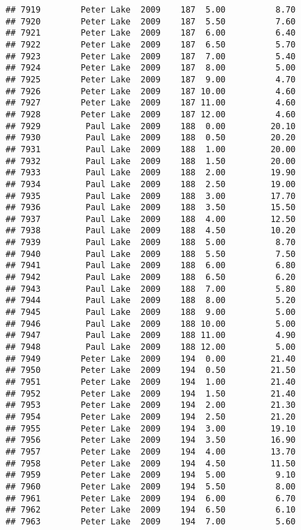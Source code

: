 \documentclass[
]{article}
\begin{document}
\begin{verbatim}
## 7919        Peter Lake  2009    187  5.00          8.70
## 7920        Peter Lake  2009    187  5.50          7.60
## 7921        Peter Lake  2009    187  6.00          6.40
## 7922        Peter Lake  2009    187  6.50          5.70
## 7923        Peter Lake  2009    187  7.00          5.40
## 7924        Peter Lake  2009    187  8.00          5.00
## 7925        Peter Lake  2009    187  9.00          4.70
## 7926        Peter Lake  2009    187 10.00          4.60
## 7927        Peter Lake  2009    187 11.00          4.60
## 7928        Peter Lake  2009    187 12.00          4.60
## 7929         Paul Lake  2009    188  0.00         20.10
## 7930         Paul Lake  2009    188  0.50         20.20
## 7931         Paul Lake  2009    188  1.00         20.00
## 7932         Paul Lake  2009    188  1.50         20.00
## 7933         Paul Lake  2009    188  2.00         19.90
## 7934         Paul Lake  2009    188  2.50         19.00
## 7935         Paul Lake  2009    188  3.00         17.70
## 7936         Paul Lake  2009    188  3.50         15.50
## 7937         Paul Lake  2009    188  4.00         12.50
## 7938         Paul Lake  2009    188  4.50         10.20
## 7939         Paul Lake  2009    188  5.00          8.70
## 7940         Paul Lake  2009    188  5.50          7.50
## 7941         Paul Lake  2009    188  6.00          6.80
## 7942         Paul Lake  2009    188  6.50          6.20
## 7943         Paul Lake  2009    188  7.00          5.80
## 7944         Paul Lake  2009    188  8.00          5.20
## 7945         Paul Lake  2009    188  9.00          5.00
## 7946         Paul Lake  2009    188 10.00          5.00
## 7947         Paul Lake  2009    188 11.00          4.90
## 7948         Paul Lake  2009    188 12.00          5.00
## 7949        Peter Lake  2009    194  0.00         21.40
## 7950        Peter Lake  2009    194  0.50         21.50
## 7951        Peter Lake  2009    194  1.00         21.40
## 7952        Peter Lake  2009    194  1.50         21.40
## 7953        Peter Lake  2009    194  2.00         21.30
## 7954        Peter Lake  2009    194  2.50         21.20
## 7955        Peter Lake  2009    194  3.00         19.10
## 7956        Peter Lake  2009    194  3.50         16.90
## 7957        Peter Lake  2009    194  4.00         13.70
## 7958        Peter Lake  2009    194  4.50         11.50
## 7959        Peter Lake  2009    194  5.00          9.10
## 7960        Peter Lake  2009    194  5.50          8.00
## 7961        Peter Lake  2009    194  6.00          6.70
## 7962        Peter Lake  2009    194  6.50          6.10
## 7963        Peter Lake  2009    194  7.00          5.60

\end{verbatim}
\end{document}
